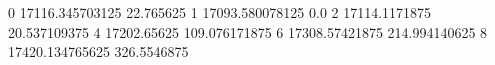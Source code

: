 0 17116.345703125 22.765625
1 17093.580078125 0.0
2 17114.1171875 20.537109375
4 17202.65625 109.076171875
6 17308.57421875 214.994140625
8 17420.134765625 326.5546875
